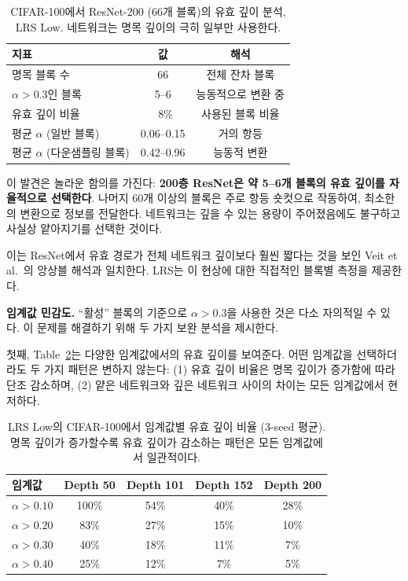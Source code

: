 \documentclass[preprint,12pt]{elsarticle}
\begin{document}
\begin{table}[t]
\centering
\caption{CIFAR-100에서 ResNet-200 (66개 블록)의 유효 깊이 분석, LRS Low. 네트워크는 명목 깊이의 극히 일부만 사용한다.}
\label{tab:effective_depth}
\begin{tabular}{lcc}
\toprule
\textbf{지표} & \textbf{값} & \textbf{해석} \\
\midrule
명목 블록 수 & 66 & 전체 잔차 블록 \\
$\alpha > 0.3$인 블록 & 5--6 & 능동적으로 변환 중 \\
유효 깊이 비율 & ~8\% & 사용된 블록 비율 \\
평균 $\alpha$ (일반 블록) & 0.06--0.15 & 거의 항등 \\
평균 $\alpha$ (다운샘플링 블록) & 0.42--0.96 & 능동적 변환 \\
\bottomrule
\end{tabular}
\end{table}

이 발견은 놀라운 함의를 가진다: \textbf{200층 ResNet은 약 5--6개 블록의 유효 깊이를 자율적으로 선택한다}. 나머지 60개 이상의 블록은 주로 항등 숏컷으로 작동하여, 최소한의 변환으로 정보를 전달한다. 네트워크는 깊을 수 있는 용량이 주어졌음에도 불구하고 사실상 얕아지기를 선택한 것이다.

이는 ResNet에서 유효 경로가 전체 네트워크 깊이보다 훨씬 짧다는 것을 보인 Veit et al.~\cite{veit2016residual}의 앙상블 해석과 일치한다. LRS는 이 현상에 대한 직접적인 블록별 측정을 제공한다.

\textbf{임계값 민감도.} ``활성'' 블록의 기준으로 $\alpha > 0.3$을 사용한 것은 다소 자의적일 수 있다. 이 문제를 해결하기 위해 두 가지 보완 분석을 제시한다.

첫째, Table~\ref{tab:threshold_sensitivity}는 다양한 임계값에서의 유효 깊이를 보여준다. 어떤 임계값을 선택하더라도 두 가지 패턴은 변하지 않는다: (1) 유효 깊이 비율은 명목 깊이가 증가함에 따라 단조 감소하며, (2) 얕은 네트워크와 깊은 네트워크 사이의 차이는 모든 임계값에서 현저하다.

\begin{table}[t]
\centering
\caption{LRS Low의 CIFAR-100에서 임계값별 유효 깊이 비율 (3-seed 평균). 명목 깊이가 증가할수록 유효 깊이가 감소하는 패턴은 모든 임계값에서 일관적이다.}
\label{tab:threshold_sensitivity}
\begin{tabular}{lcccc}
\toprule
\textbf{임계값} & \textbf{Depth 50} & \textbf{Depth 101} & \textbf{Depth 152} & \textbf{Depth 200} \\
\midrule
$\alpha > 0.10$ & 100\% & 54\% & 40\% & 28\% \\
$\alpha > 0.20$ & 83\% & 27\% & 15\% & 10\% \\
$\alpha > 0.30$ & 40\% & 18\% & 11\% & 7\% \\
$\alpha > 0.40$ & 25\% & 12\% & 7\% & 5\% \\
\bottomrule
\end{tabular}
\end{table}
\end{document}
